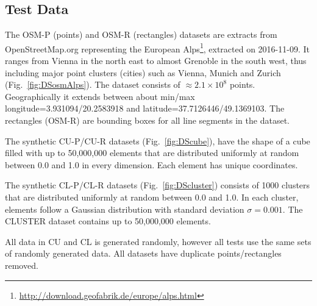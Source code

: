 \documentclass{vldb}
\begin{document}
\subsection{Test Data}

The OSM-P (points) and OSM-R (rectangles) datasets are extracts from OpenStreetMap.org representing the European Alps\footnote{\url{http://download.geofabrik.de/europe/alps.html}}, extracted on 2016-11-09. It ranges from Vienna in the north east to almost Grenoble in the south west, thus including major point clusters (cities) such as Vienna, Munich and Zurich 
(Fig.~\ref{fig:DSosmAlps}). The dataset consists of $\approx 2.1 \times 10^8$ points.
Geographically it extends between about min/max longitude=3.931094/20.2583918 and latitude=37.7126446/49.1369103.
The rectangles (OSM-R) are bounding boxes for all line segments in the dataset.

The synthetic CU-P/CU-R datasets (Fig.~\ref{fig:DScube}), have the shape of a cube filled with up to 50,000,000 elements that are distributed uniformly at random between 0.0 and 1.0 in every dimension. Each element has unique coordinates.

The synthetic CL-P/CL-R datasets (Fig.~\ref{fig:DScluster}) consists of 1000 clusters that are distributed uniformly at random between 0.0 and 1.0. In each cluster, elements follow a Gaussian distribution with standard deviation $\sigma = 0.001$.
The CLUSTER dataset contains up to 50,000,000 elements. 

All data in CU and CL is generated randomly, however all tests use the same sets of randomly generated data. All datasets have duplicate points/rectangles removed.
\end{document}
